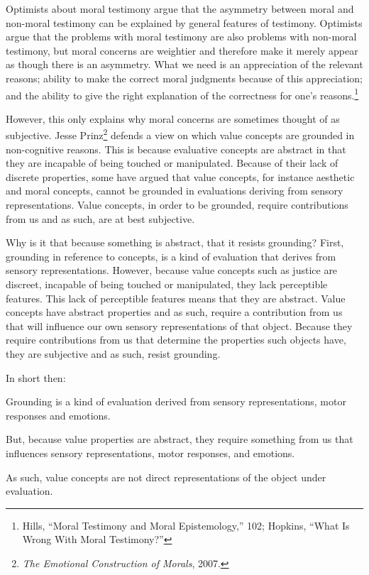 \documentclass[phdthesis,12pt,final]{wuthesis}
\theoremstyle{definition}
\theoremstyle{definition}
\theoremstyle{definition}
\theoremstyle{definition}
\theoremstyle{remark}
\begin{document}
Optimists about moral testimony argue that the asymmetry between moral and non-moral testimony can be explained by general features of testimony. Optimists argue that the problems with moral testimony are also problems with non-moral testimony, but moral concerns are weightier and therefore make it merely appear as though there is an asymmetry. What we need is an appreciation of the relevant reasons; ability to make the correct moral judgments because of this appreciation; and the ability to give the right explanation of the correctness for one's reasons.\footnote{Hills, {``Moral Testimony and Moral Epistemology,''} 102; Hopkins, {``What {Is Wrong With Moral Testimony}?''}}

However, this only explains why moral concerns are sometimes thought of as subjective. Jesse Prinz\footnote{\emph{The {Emotional Construction} of {Morals}}, 2007.} defends a view on which value concepts are grounded in non-cognitive reasons. This is because evaluative concepts are abstract in that they are incapable of being touched or manipulated. Because of their lack of discrete properties, some have argued that value concepts, for instance aesthetic and moral concepts, cannot be grounded in evaluations deriving from sensory representations. Value concepts, in order to be grounded, require contributions from us and as such, are at best subjective.

Why is it that because something is abstract, that it resists grounding? First, grounding in reference to concepts, is a kind of evaluation that derives from sensory representations. However, because value concepts such as justice are discreet, incapable of being touched or manipulated, they lack perceptible features. This lack of perceptible features means that they are abstract. Value concepts have abstract properties and as such, require a contribution from us that will influence our own sensory representations of that object. Because they require contributions from us that determine the properties such objects have, they are subjective and as such, resist grounding.

In short then:

Grounding is a kind of evaluation derived from sensory representations, motor responses and emotions.

But, because value properties are abstract, they require something from us that influences sensory representations, motor responses, and emotions.

As such, value concepts are not direct representations of the object under evaluation.
\end{document}
